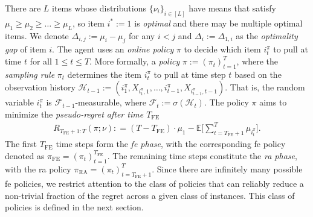 \documentclass[twoside,11pt]{article}
\newcommand{\calF}{\mathcal{F}}
\newcommand{\calH}{\mathcal{H}}
\newcommand{\bbE}{\mathbb{E}}
\newcommand{\Tfe}{T_{\mathrm{FE}}}
\newcommand{\FE}{\textrm{FE}}
\newcommand{\RA}{\textrm{RA}}
\begin{document}
There are $L$ items whose distributions $\{\nu_i\}_{  i\in [L]}$ have means that satisfy %
$\mu_1 \geq \mu_2  \ge \ldots \ge \mu_L $, so item $i^*:=1$ is {\em optimal} and there may be multiple optimal items.
We denote $\Delta_{i,j} := \mu_i -\mu_j $ for any $i<j$ and $\Delta_{i} := \Delta_{1,i} $ as the {\em optimality gap} of item $ i $.
The agent uses an {\em online policy} $\pi$ to decide which item $i_t^{\pi }$ to pull at time  $t$ for all $1\le t\le T$.
More formally, a {\em policy} 
$\pi := (\pi_t)_{t=1}^{T}$, 
where the {\em sampling rule} $\pi_t$ determines the item $i_t^{\pi }$ to pull at time step $t$ based on the observation history $\calH_{t-1}:=(i_1^{\pi },  X_{ i_1^{\pi },1} , \ldots,  i_{t-1}^{\pi },   X_{  i_{t-1}^{\pi },{t-1}})$. That is, the random variable $i_t^{\pi }$ is $\calF_{t-1} $-measurable, where     
    $\calF_t  :=  \sigma ( \calH_t ) $.
The policy $\pi$ aims to minimize the {\em pseudo-regret after time $\Tfe$}
\begin{align*}
     R_{\Tfe+1:T} (\pi;\nu ) :
     = (T-\Tfe) \cdot \mu_1 -  \bbE \Bigg[ \sum_{t=\Tfe+1}^T  \mu_{i_t^\pi} \Bigg].
\end{align*}
The first \(\Tfe\) time steps form the {\em  \ac{fe} phase}, with the corresponding \ac{fe} policy denoted as \(\pi_{\FE}=(\pi_t)_{t=1}^{\Tfe}\). The remaining time steps constitute the  {\em \ac{ra} phase}, with the \ac{ra} policy \(\pi_{\RA}=(\pi_t)_{t=\Tfe+1}^{T}\). 
Since there are infinitely many possible \ac{fe} policies, we restrict attention to the class of policies that can reliably reduce a non-trivial fraction of the regret across a given class of instances. This class of policies is defined in the next section. 
\end{document}
